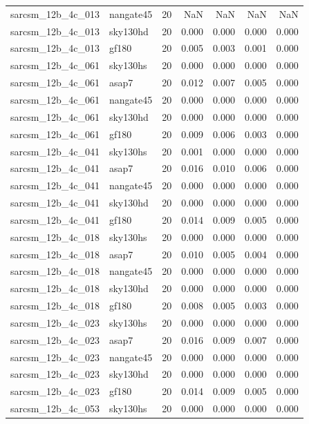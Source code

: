 \begin{tabular}{llrrrrr}
sarcsm\_12b\_4c\_013 & nangate45 & 20 & NaN & NaN & NaN & NaN \\
sarcsm\_12b\_4c\_013 & sky130hd & 20 & 0.000 & 0.000 & 0.000 & 0.000 \\
sarcsm\_12b\_4c\_013 & gf180 & 20 & 0.005 & 0.003 & 0.001 & 0.000 \\
sarcsm\_12b\_4c\_061 & sky130hs & 20 & 0.000 & 0.000 & 0.000 & 0.000 \\
sarcsm\_12b\_4c\_061 & asap7 & 20 & 0.012 & 0.007 & 0.005 & 0.000 \\
sarcsm\_12b\_4c\_061 & nangate45 & 20 & 0.000 & 0.000 & 0.000 & 0.000 \\
sarcsm\_12b\_4c\_061 & sky130hd & 20 & 0.000 & 0.000 & 0.000 & 0.000 \\
sarcsm\_12b\_4c\_061 & gf180 & 20 & 0.009 & 0.006 & 0.003 & 0.000 \\
sarcsm\_12b\_4c\_041 & sky130hs & 20 & 0.001 & 0.000 & 0.000 & 0.000 \\
sarcsm\_12b\_4c\_041 & asap7 & 20 & 0.016 & 0.010 & 0.006 & 0.000 \\
sarcsm\_12b\_4c\_041 & nangate45 & 20 & 0.000 & 0.000 & 0.000 & 0.000 \\
sarcsm\_12b\_4c\_041 & sky130hd & 20 & 0.000 & 0.000 & 0.000 & 0.000 \\
sarcsm\_12b\_4c\_041 & gf180 & 20 & 0.014 & 0.009 & 0.005 & 0.000 \\
sarcsm\_12b\_4c\_018 & sky130hs & 20 & 0.000 & 0.000 & 0.000 & 0.000 \\
sarcsm\_12b\_4c\_018 & asap7 & 20 & 0.010 & 0.005 & 0.004 & 0.000 \\
sarcsm\_12b\_4c\_018 & nangate45 & 20 & 0.000 & 0.000 & 0.000 & 0.000 \\
sarcsm\_12b\_4c\_018 & sky130hd & 20 & 0.000 & 0.000 & 0.000 & 0.000 \\
sarcsm\_12b\_4c\_018 & gf180 & 20 & 0.008 & 0.005 & 0.003 & 0.000 \\
sarcsm\_12b\_4c\_023 & sky130hs & 20 & 0.000 & 0.000 & 0.000 & 0.000 \\
sarcsm\_12b\_4c\_023 & asap7 & 20 & 0.016 & 0.009 & 0.007 & 0.000 \\
sarcsm\_12b\_4c\_023 & nangate45 & 20 & 0.000 & 0.000 & 0.000 & 0.000 \\
sarcsm\_12b\_4c\_023 & sky130hd & 20 & 0.000 & 0.000 & 0.000 & 0.000 \\
sarcsm\_12b\_4c\_023 & gf180 & 20 & 0.014 & 0.009 & 0.005 & 0.000 \\
sarcsm\_12b\_4c\_053 & sky130hs & 20 & 0.000 & 0.000 & 0.000 & 0.000 \\

\end{tabular}
